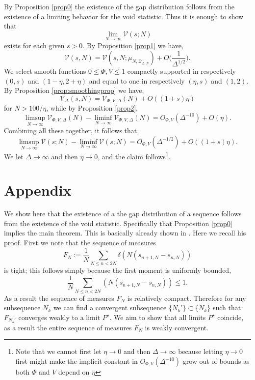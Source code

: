 \documentclass[12pt,reqno]{amsart}
\theoremstyle{plain}
\numberwithin{equation}{section}
\numberwithin{figure}{section}
\theoremstyle{plain}
\theoremstyle{definition}
\theoremstyle{remark}
\begin{document}
By Proposition \ref{prop0} the existence of the gap distribution follows from the existence of a limiting behavior for the void statistic. Thus it is enough to show that
$$
\lim_{N \rightarrow \infty} \mathcal{V}(s; N)
$$
exists for each given $s > 0$.  By Proposition \ref{prop1} we have,
$$
\mathcal{V}(s,N)
 = \mathcal{V}(s,N; \mu_{N, \mathcal{Q}_{\Delta, N}}) + O \Big ( \frac{1}{\Delta^{1/2}} \Big ). 
 $$
 We select smooth functions $0 \leq \Phi, V \leq 1$ compactly supported in respectively $(0,s)$ and $(1 - \eta,2 + \eta)$ and
 equal to one in respectively $(\eta,s)$ and $(1, 2)$.
 By Proposition \ref{prop:smoothingprop} we have,
 $$
 \mathcal{V}_{\Delta}(s, N) = \mathcal{V}_{\Phi, V, \Delta}(N) + O((1 + s) \eta)
$$
for $N > 100 / \eta$, 
 while by Proposition \ref{prop2},
$$ 
\limsup_{N \rightarrow \infty} \mathcal{V}_{\Phi, V, \Delta}(N)
 - \liminf_{N \rightarrow \infty} \mathcal{V}_{\Phi, V, \Delta}(N) 
= O_{\Phi, V}(\Delta^{-10}) + O(\eta) .
$$
Combining all these together, it follows that,
$$
\limsup_{N \rightarrow \infty} \mathcal{V}(s; N) 
- \liminf_{N \rightarrow \infty} \mathcal{V}(s; N) = 
O_{\Phi, V}(\Delta^{-1/2}) + O((1 + s) \eta).
$$
We let $\Delta \rightarrow \infty$ and then $\eta \rightarrow 0$, and the claim follows\footnote{Note that we cannot first let $\eta \rightarrow 0$ and then $\Delta \rightarrow \infty$ because letting $\eta \rightarrow 0$ first might make the implicit constant in $O_{\Phi, V}(\Delta^{-10})$ grow out of bounds as both $\Phi$ and $V$ depend on $\eta$}. 
\section{Appendix}

We show here that the existence of a the gap distribution of a sequence follows from the existence of the void statistic. 
Specifically that Proposition \ref{prop0} implies the main theorem. 
This is basically already shown in \cite{Marklof}. Here we recall his proof. First we note that the sequence of measures
$$
F_{N} := \frac{1}{N} \sum_{N \leq n < 2N} \delta  ( N (s_{n + 1, N} - s_{n, N} ) )
$$
is tight; this follows simply because the first moment is uniformly bounded, 
$$
\frac{1}{N} \sum_{N \leq n < 2N} (N (s_{n + 1, N} - s_{n, N})) \leq 1.
$$
As a result the sequence of measures $F_{N}$ is relatively compact. Therefore for any subsequence $N_k$ we can find a convergent subsequence $\{ N_k' \} \subset \{ N_k \}$ such that $F_{N_k'}$ converges weakly to a limit $P^{\star}$. We aim to show that all limits $P^{\star}$ coincide, as a result the entire sequence of measures $F_{N}$ is weakly convergent.
\end{document}
